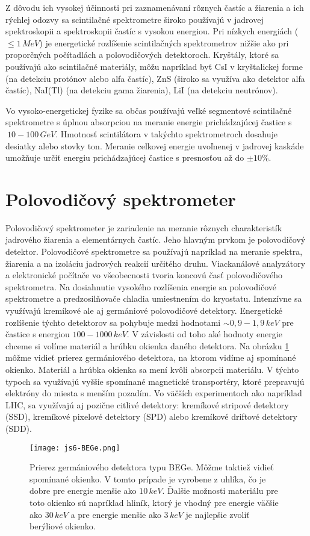 \documentclass[../../main.tex]{subfiles}
\begin{document}
Z dôvodu ich vysokej účinnosti pri zaznamenávaní rôznych častíc a žiarenia a ich rýchlej odozvy sa scintilačné spektrometre široko používajú v jadrovej spektroskopii a spektroskopii častíc s vysokou energiou. Pri nízkych energiách ($\leq1\,MeV$) je energetické rozlíšenie scintilačných spektrometrov nižšie ako pri proporčných počítadlách a polovodičových detektoroch. Kryštály, ktoré sa používajú ako scintilačné materiály, môžu napríklad byť CsI v kryštalickej forme (na detekciu protónov alebo alfa častíc), ZnS (široko sa využíva ako detektor alfa častíc), NaI(Tl) (na detekciu gama žiarenia), LiI (na detekciu neutrónov).

Vo vysoko-energetickej fyzike sa občas používajú veľké segmentové scintilačné spektrometre s úplnou absorpciou na meranie energie prichádzajúcej častice s $~10-100\,GeV$. Hmotnosť scintilátora v takýchto spektrometroch dosahuje desiatky alebo stovky ton. Meranie celkovej energie uvoľnenej v jadrovej kaskáde umožňuje určiť energiu prichádzajúcej častice s presnosťou až do $\pm10\%$.

\section{Polovodičový spektrometer}
Polovodičový spektrometer je zariadenie na meranie rôznych charakteristík jadrového žiarenia a elementárnych častíc. Jeho hlavným prvkom je polovodičový detektor. Polovodičové spektrometre sa používajú napríklad na meranie spektra, žiarenia a na izoláciu jadrových reakcií určitého druhu. Viackanálové analyzátory a elektronické počítače vo všeobecnosti tvoria koncovú časť polovodičového spektrometra. Na dosiahnutie vysokého rozlíšenia energie sa polovodičové spektrometre a predzosilňovače chladia umiestnením do kryostatu. Intenzívne sa využívajú kremíkové ale aj germániové polovodičové detektory. Energetické rozlíšenie týchto detektorov sa pohybuje medzi hodnotami $\sim 0,9-1,9\,keV$ pre častice s energiou $100-1000\,keV$. V závislosti od toho aké hodnoty energie chceme si volíme materiál a hrúbku okienka daného detektora. Na obrázku \ref{js6:fig:BEGe} môžme vidieť prierez germániového detektora, na ktorom vidíme aj spomínané okienko. Materiál a hrúbka okienka sa mení kvôli absorpcii materiálu. V týchto typoch sa využívajú vyššie spomínané magnetické transportéry, ktoré prepravujú elektróny do miesta s menším pozadím. Vo väčších experimentoch ako napríklad LHC, sa využívajú aj pozične citlivé detektory: kremíkové stripové detektory (SSD), kremíkové pixelové detektory (SPD) alebo kremíkové driftové detektory (SDD).
\begin{figure}[!h]
\centering
\texttt{[image: js6-BEGe.png]}
\caption{Prierez germániového detektora typu BEGe. Môžme taktiež vidieť spomínané okienko. V tomto prípade je vyrobene z uhlíka, čo je dobre pre energie menšie ako $10\,keV$. Ďalšie možnosti materiálu pre toto okienko sú napríklad hliník, ktorý je vhodný pre energie väčšie ako $30\,keV$ a pre energie menšie ako $3\,keV$ je najlepšie zvoliť berýliové okienko.}
\label{js6:fig:BEGe}
\end{figure}
\end{document}
